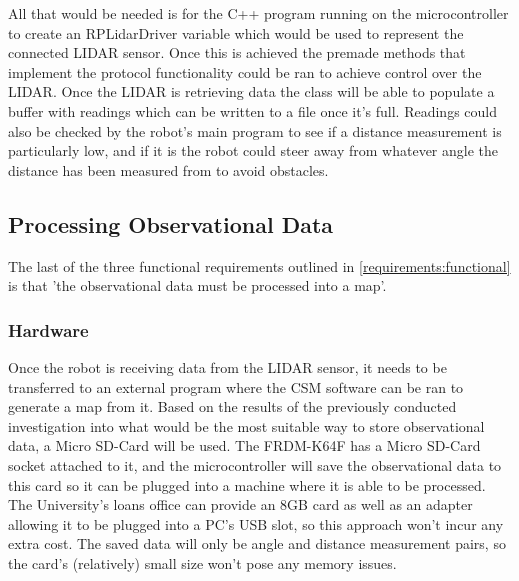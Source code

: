 				All that would be needed is for the C++ program running on the microcontroller to create an RPLidarDriver variable which would be used to represent the connected LIDAR sensor. Once this is achieved the premade methods that implement the protocol functionality could be ran to achieve control over the LIDAR. Once the LIDAR is retrieving data the class will be able to populate a buffer with readings which can be written to a file once it's full. Readings could also be checked by the robot's main program to see if a distance measurement is particularly low, and if it is the robot could steer away from whatever angle the distance has been measured from to avoid obstacles.
				
			\subsection{Processing Observational Data}
			\label{section:processing:intro}
			The last of the three functional requirements outlined in \ref{requirements:functional} is that 'the observational data must be processed into a map'.
				\subsubsection{Hardware}
				Once the robot is receiving data from the LIDAR sensor, it needs to be transferred to an external program where the CSM software can be ran to generate a map from it. Based on the results of the previously conducted investigation into what would be the most suitable way to store observational data, a Micro SD-Card will be used. The FRDM-K64F has a Micro SD-Card socket attached to it, and the microcontroller will save the observational data to this card so it can be plugged into a machine where it is able to be processed. The University's loans office can provide an 8GB card as well as an adapter allowing it to be plugged into a PC's USB slot, so this approach won't incur any extra cost. The saved data will only be angle and distance measurement pairs, so the card's (relatively) small size won't pose any memory issues. 
				
